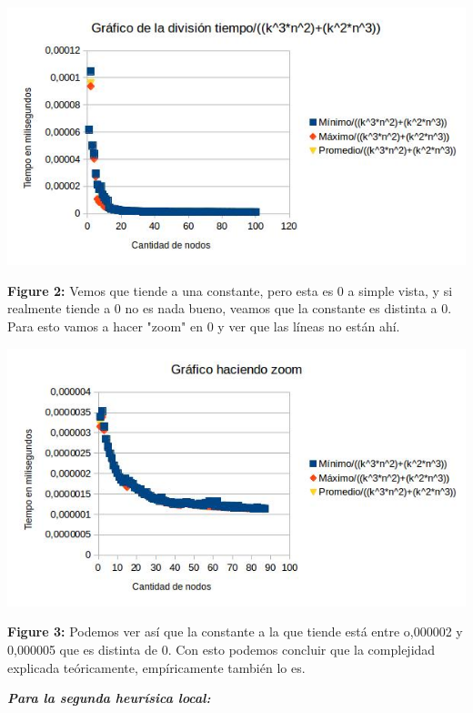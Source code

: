 \documentclass[a4paper]{article}
\begin{document}
\includegraphics[width=\textwidth,height=\textheight,keepaspectratio
]{local1KfijoConstante.jpg}
\begin {flushleft}
\textbf{Figure 2:} Vemos que tiende a una constante, pero esta es 0 a simple vista, y si realmente tiende a 0 no es nada bueno, veamos que la constante es distinta a 0. Para esto vamos a hacer "zoom" en 0 y ver que las líneas no están ahí.\newline
\end{flushleft}

\includegraphics[width=\textwidth,height=\textheight,keepaspectratio
]{local1KfijoConstanteZoom.jpg}
\begin {flushleft}
\textbf{Figure 3:} Podemos ver así que la constante a la que tiende está entre o,000002 y 0,000005 que es distinta de 0. Con esto podemos concluir que la complejidad explicada teóricamente, empíricamente también lo es.
\end{flushleft}
\vspace{0.4cm}


\textbf{\textit{Para la segunda heurísica local:}\newline}
\end{document}
